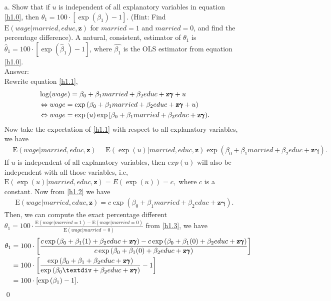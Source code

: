 \documentclass[10pt]{article}
\newcommand{\E}{\text{E}}
\begin{document}
\begin{enumerate}
\item[a.] Show that if $u$ is independent of all explanatory variables in equation \eqref{h1.0}, then $\theta_1=100\cdot[\exp(\beta_1)-1]$. (Hint: Find $\E(wage|married,educ,\mathbf{z})$ for $married=1$ and $married=0$, and find the percentage difference). A natural, consistent, estimator of $\theta_1$ is $\hat{\theta}_1=100\cdot[\exp(\hat{\beta}_1)-1]$, where $\hat{\beta_1}$ is the OLS estimator from equation \eqref{h1.0}.
\\ Answer:\\
Rewrite equation \eqref{h1.1},
\begin{align}
    &\log(wage)=\beta_0+\beta_1 married +\beta_2 educ+\mathbf{z\pmb{\gamma}}+u \notag\\
    &\Leftrightarrow wage=\exp{(\beta_0+\beta_1 married +\beta_2 educ+\mathbf{z\pmb{\gamma}}+u)} \notag\\
    &\Leftrightarrow wage=\exp{(u)}\exp{[\beta_0+\beta_1 married +\beta_2 educ+\mathbf{z\pmb{\gamma}})}. \label{h1.1}
\end{align}
Now take the expectation of \eqref{h1.1} with respect to all explanatory variables, we have
\begin{align}
    &\E(wage|married,educ,\mathbf{z})=\E(\exp{(u)}|married,educ,\mathbf{z})\exp{(\beta_0+\beta_1 married +\beta_2 educ+\mathbf{z}\pmb{\gamma})}.\label{h1.2}
\end{align}
If $u$ is independent of all explanatory variables, then $exp(u)$ will also be independent with all those variables, i.e, $\E(\exp{(u)}|married,educ,\mathbf{z})=E(\exp(u))=c,$ where $c$ is a constant. Now from \eqref{h1.2} we have
\begin{align}
    \E(wage|married,educ,\mathbf{z})=c\exp{(\beta_0+\beta_1 married +\beta_2 educ+\mathbf{z}\pmb{\gamma})}. \label{h1.3}
\end{align}
Then, we can compute the exact percentage different $\theta_1=100\cdot\frac{\E(wage|married=1)-\E(wage|married=0)}{\E(wage|married=0)}$ from \eqref{h1.3}, we have
\begin{align}
    \theta_1&=100\cdot\left[\frac{c\exp{(\beta_0+\beta_1 (1) +\beta_2 educ+\mathbf{z}\pmb{\gamma})}-c\exp{(\beta_0+\beta_1 (0) +\beta_2 educ+\mathbf{z}\pmb{\gamma})}}{c\exp{(\beta_0+\beta_1 (0) +\beta_2 educ+\mathbf{z}\pmb{\gamma})}}\right] \notag \\
    &=100\cdot\left[\frac{\exp{(\beta_0+\beta_1 +\beta_2 educ+\mathbf{z}\pmb{\gamma})}}{\exp{(\beta_0÷ +\beta_2 educ+\mathbf{z}\pmb{\gamma})}}-1\right] \notag \\
    &=100\cdot[\exp{(\beta_1)}-1]. \notag
\end{align} \qed


\end{enumerate}
\end{document}
